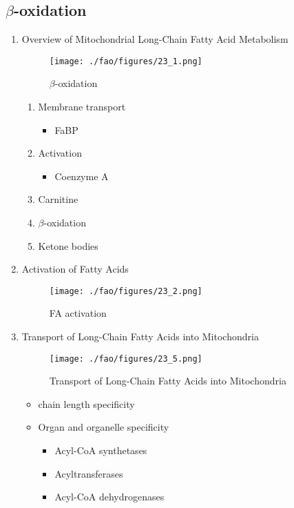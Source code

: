 \documentclass{scrartcl}
\begin{document}
\subsection{\(\beta\)-oxidation}
\label{sec:orgc97f4a4}
\begin{enumerate}
\item Overview of Mitochondrial Long-Chain Fatty Acid Metabolism
\label{sec:org0dbc0cd}

\begin{figure}[htbp]
\centering
\texttt{[image: ./fao/figures/23\_1.png]}
\caption{\label{fig:orgece3e9f}
\(\beta\)-oxidation}
\end{figure}

\begin{enumerate}
\item Membrane transport
\begin{itemize}
\item FaBP
\end{itemize}
\item Activation
\begin{itemize}
\item Coenzyme A
\end{itemize}
\item Carnitine
\item \(\beta\)-oxidation
\item Ketone bodies
\end{enumerate}

\item Activation of Fatty Acids
\label{sec:org1cf584d}
\begin{figure}[htbp]
\centering
\texttt{[image: ./fao/figures/23\_2.png]}
\caption{\label{fig:orgfb12ae2}
FA activation}
\end{figure}

\item Transport of Long-Chain Fatty Acids into Mitochondria
\label{sec:org43080d3}
\begin{figure}[htbp]
\centering
\texttt{[image: ./fao/figures/23\_5.png]}
\caption{\label{fig:org9153d82}
Transport of Long-Chain Fatty Acids into Mitochondria}
\end{figure}

\begin{itemize}
\item chain length specificity
\item Organ and organelle specificity
\begin{itemize}
\item Acyl-CoA synthetases
\item Acyltransferases
\item Acyl-CoA dehydrogenases
\end{itemize}
\end{itemize}



\end{enumerate}
\end{document}
